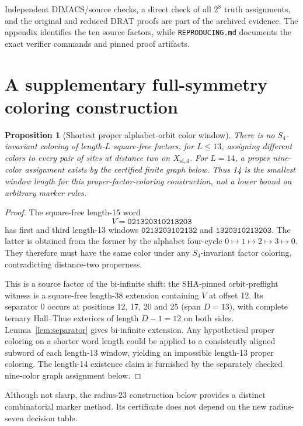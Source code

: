 \documentclass[11pt]{article}
\newtheorem{proposition}[theorem]{Proposition}
\theoremstyle{remark}
\newcommand{\Xsf}{X_{\mathrm{sf},4}}
\begin{document}
Independent DIMACS/source checks, a direct check of all $2^8$
truth assignments, and the original and reduced DRAT proofs are
part of the archived evidence. The appendix identifies the ten source factors, while
\texttt{REPRODUCING.md} documents the exact verifier commands
and pinned proof artifacts.

\section{A supplementary full-symmetry coloring construction}

\begin{proposition}[Shortest proper alphabet-orbit color window]
\label{prop:minimum-color-window}
There is no $S_4$-invariant coloring of length-$L$
square-free factors, for $L\le13$, assigning different
colors to every pair of sites at distance two on
$\Xsf$. For $L=14$, a proper nine-color assignment
exists by the certified finite graph below.
Thus 14 is the smallest window length for this
\emph{proper-factor-coloring construction}, not a
lower bound on arbitrary marker rules.
\end{proposition}
\begin{proof}
The square-free length-15 word
\[
 V=\texttt{021320310213203}
\]
has first and third length-13 windows
$\texttt{0213203102132}$ and
$\texttt{1320310213203}$.
The latter is obtained from the former by the
alphabet four-cycle $0\mapsto1\mapsto2\mapsto3
\mapsto0$. They therefore must have the same
color under any $S_4$-invariant factor coloring,
contradicting distance-two properness.

This is a source factor of the bi-infinite shift:
the SHA-pinned orbit-preflight witness is a
square-free length-38 extension containing $V$
at offset 12. Its separator $0$ occurs at positions
12, 17, 20 and 25 (span $D=13$), with complete
ternary Hall--Thue exteriors of length $D-1=12$
on both sides. Lemma~\ref{lem:separator} gives
bi-infinite extension. Any hypothetical proper
coloring on a shorter word length could be applied
to a consistently aligned subword of each
length-13 window, yielding an impossible
length-13 proper coloring. The length-14 existence
claim is furnished by the separately checked
nine-color graph assignment below.
\end{proof}

Although not sharp, the radius-23 construction below
provides a distinct combinatorial marker method.
Its certificate does not depend on the new radius-seven
decision table.
\end{document}

